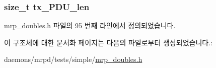 \subsubsection[{\texorpdfstring{tx\+\_\+\+P\+D\+U\+\_\+len}{tx_PDU_len}}]{\setlength{\rightskip}{0pt plus 5cm}size\+\_\+t tx\+\_\+\+P\+D\+U\+\_\+len}\hypertarget{structmrpd__test__state_ad360819aed2594ba5819d7d147292634}{}\label{structmrpd__test__state_ad360819aed2594ba5819d7d147292634}


mrp\+\_\+doubles.\+h 파일의 95 번째 라인에서 정의되었습니다.



이 구조체에 대한 문서화 페이지는 다음의 파일로부터 생성되었습니다.\+:\begin{DoxyCompactItemize}
\item 
daemons/mrpd/tests/simple/\hyperlink{mrp__doubles_8h}{mrp\+\_\+doubles.\+h}\end{DoxyCompactItemize}
